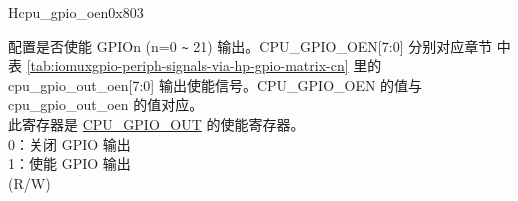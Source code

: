 \begin{register}{H}{cpu\_gpio\_oen}{0x803}\label{regdesc:GPIO_OEN}
%
%
%
%
%
%
%
%
%
\regnewline%
\begin{regdesc}\begin{reglist}
\label{fielddesc:GPIO_OEN}\item [CPU\_GPIO\_OEN] 配置是否使能 GPIOn (n=0 \verb+~+ 21) 输出。CPU\_GPIO\_OEN[7:0] 分别对应章节 \textit{} 中表 \ref{tab:iomuxgpio-periph-signals-via-hp-gpio-matrix-cn} 里的 cpu\_gpio\_out\_oen[7:0] 输出使能信号。CPU\_GPIO\_OEN 的值与 cpu\_gpio\_out\_oen 的值对应。\\
此寄存器是 \hyperref[fielddesc:GPIO_OUT]{CPU\_GPIO\_OUT} 的使能寄存器。\\
0：关闭 GPIO 输出\\
1：使能 GPIO 输出\\
(R/W)
\end{reglist}\end{regdesc}
\end{register}


